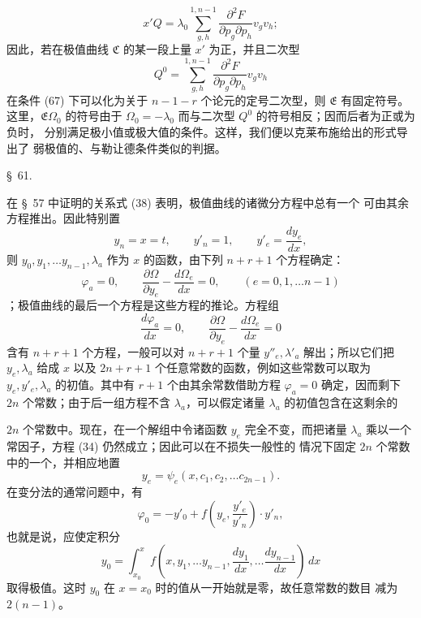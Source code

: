 \documentclass[11pt,a4paper,leqno]{article}
\begin{document}
\[
x'Q=\lambda_0\sum_{g,h}^{1,n-1}
\frac{\partial^2F}{\partial p_g\partial p_h}v_gv_h;
\]
因此，若在极值曲线 $\mathfrak{C}$ 的某一段上量 $x'$ 为正，并且二次型
\[
Q^0=\sum_{g,h}^{1,n-1}
\frac{\partial^2F}{\partial p_g\partial p_h}v_gv_h
\]
在条件 (67) 下可以化为关于 $n-1-r$ 个论元的定号二次型，则
$\mathfrak{E}$ 有固定符号。这里，$\mathfrak{E}\Omega_0$ 的符号由于
$\Omega_0=-\lambda_0$ 而与二次型 $Q^0$ 的符号相反；因而后者为正或为负时，
分别满足极小值或极大值的条件。这样，我们便以克莱布施给出的形式导出了
弱极值的、与勒让德条件类似的判据。


\begin{center}
{\large \S~61.}
\end{center}

在 \S~57 中证明的关系式 (38) 表明，极值曲线的诸微分方程中总有一个
可由其余方程推出。因此特别置
\[
y_n=x=t,\qquad y'_n=1,\qquad y'_e=\frac{dy_e}{dx},
\]
则 $y_0,y_1,\ldots y_{n-1},\lambda_a$ 作为 $x$ 的函数，由下列
$n+r+1$ 个方程确定：
\begin{equation}\tag{68}
\varphi_a=0,\qquad
\frac{\partial\Omega}{\partial y_e}-\frac{d\Omega_e}{dx}=0,
\qquad(e=0,1,\ldots n-1)
\end{equation}
；极值曲线的最后一个方程是这些方程的推论。方程组
\[
\frac{d\varphi_a}{dx}=0,\qquad
\frac{\partial\Omega}{\partial y_e}-\frac{d\Omega_e}{dx}=0
\]
含有 $n+r+1$ 个方程，一般可以对 $n+r+1$ 个量
$y''_e,\lambda'_a$ 解出；所以它们把 $y_e,\lambda_a$ 给成 $x$ 以及
$2n+r+1$ 个任意常数的函数，例如这些常数可以取为
$y_e,y'_e,\lambda_a$ 的初值。其中有 $r+1$ 个由其余常数借助方程
$\varphi_a=0$ 确定，因而剩下 $2n$ 个常数；由于后一组方程不含
$\lambda_a$，可以假定诸量 $\lambda_a$ 的初值包含在这剩余的

$2n$ 个常数中。现在，在一个解组中令诸函数 $y_e$ 完全不变，而把诸量
$\lambda_a$ 乘以一个常因子，方程 (34) 仍然成立；因此可以在不损失一般性的
情况下固定 $2n$ 个常数中的一个，并相应地置
\begin{equation}\tag{69}
y_e=\psi_e(x,c_1,c_2,\ldots c_{2n-1}).
\end{equation}
在变分法的通常问题中，有
\[
\varphi_0=-y'_0+f\left(y_e,\frac{y'_e}{y'_n}\right)\cdot y'_n,
\]
也就是说，应使定积分
\[
y_0=\int_{x_0}^{x}
f\left(x,y_1,\ldots y_{n-1},\frac{dy_1}{dx},\ldots\frac{dy_{n-1}}{dx}\right)\,dx
\]
取得极值。这时 $y_0$ 在 $x=x_0$ 时的值从一开始就是零，故任意常数的数目
减为 $2(n-1)$。
\end{document}
